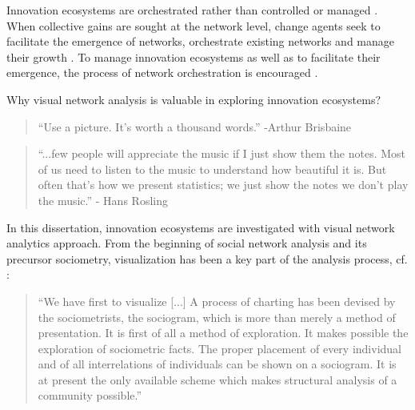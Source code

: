 Innovation ecosystems are orchestrated rather than controlled or managed \citep{Russell2011TransformingOrchestration,Ritala2009,Ritala2013}. When collective gains are sought at the network level, change agents seek to facilitate the emergence of networks, orchestrate existing networks and manage their growth \citep{Russell2011TransformingOrchestration}. To manage innovation ecosystems as well as to facilitate their emergence, the process of network orchestration is encouraged \citep{Russell2015RelationalEcosystems}.

Why visual network analysis is valuable in exploring innovation ecosystems?

\begin{quote}
``Use a picture. It's worth a thousand words.'' -Arthur Brisbaine \citep{Bendoly2016FitAnalytics}
\end{quote}

\begin{quote}
``...few people will appreciate the music if I just show them the notes. Most of us need to listen to the music to understand how beautiful it is. But often that’s how we present statistics; we just show the notes we don’t play the music.'' - Hans Rosling 
\end{quote}

In this dissertation, innovation ecosystems are investigated with visual network analytics approach. From the beginning of social network analysis and its precursor sociometry, visualization has been a key part of the analysis process, cf. \cite{Moreno1953}:
\begin{quote}
``We have first to visualize [...] A process of charting has been devised by the sociometrists, the sociogram, which is more than merely a method of presentation. It is first of all a method of exploration. It makes possible the exploration of sociometric facts. The proper placement of every individual and of all interrelations of individuals can be shown on a sociogram. It is at present the only available scheme which makes structural analysis of a community possible.''\end{quote}


